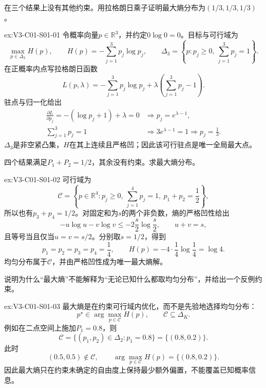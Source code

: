 \begin{SLChapterExercisePairSection}

\begin{exercise}\label{ex:V3-C01-S01-01}
在三个结果上没有其他约束。用拉格朗日乘子证明最大熵分布为$(1/3,1/3,1/3)$。
\end{exercise}
\ifSLFullEdition
{}\label{sol:V3-C01-S01-01}
\begin{chapterexercisesolution}{ex:V3-C01-S01-01}
令概率向量$p\in\mathbb R^3$，并约定$0\log0=0$。目标与可行域为
\[
\max_{p\in\Delta_3}H(p),
\qquad
H(p)=-\sum_{j=1}^{3}p_j\log p_j,
\qquad
\Delta_3=\left\{p:p_j\geq0,\ \sum_{j=1}^{3}p_j=1\right\}.
\]
在正概率内点写拉格朗日函数
\[
L(p,\lambda)=-\sum_{j=1}^{3}p_j\log p_j
+\lambda\left(\sum_{j=1}^{3}p_j-1\right).
\]
驻点与归一化给出
\[
\begin{aligned}
\frac{\partial L}{\partial p_j}=-(\log p_j+1)+\lambda=0
&\Longrightarrow p_j=e^{\lambda-1},\\
\sum_{j=1}^{3}p_j=1
&\Longrightarrow 3e^{\lambda-1}=1
\Longrightarrow p_j=\frac13.
\end{aligned}
\]
$\Delta_3$是非空紧凸集，$H$在其上连续且严格凹；因此该可行驻点是唯一全局最大点。
\end{chapterexercisesolution}
\fi

\begin{exercise}\label{ex:V3-C01-S01-02}
四个结果满足$P_1+P_2=1/2$，其余没有约束。求最大熵分布。
\end{exercise}
\ifSLFullEdition
{}\label{sol:V3-C01-S01-02}
\begin{chapterexercisesolution}{ex:V3-C01-S01-02}
可行域为
\[
\mathcal C=\left\{p\in\mathbb R^4:
p_j\geq0,\ \sum_{j=1}^{4}p_j=1,\ p_1+p_2=\frac12\right\},
\]
所以也有$p_3+p_4=1/2$。对固定和为$s$的两个非负数，熵的严格凹性给出
\[
-u\log u-v\log v
\leq -2\frac{s}{2}\log\frac{s}{2},
\qquad
u+v=s,
\]
且等号当且仅当$u=v=s/2$。分别取$s=1/2$，得到
\[
p_1=p_2=p_3=p_4=\frac14,
\qquad
H(p)=-4\cdot\frac14\log\frac14=\log4.
\]
均匀分布属于$\mathcal C$，并由严格凹性成为唯一最大熵解。
\end{chapterexercisesolution}
\fi

\begin{exercise}\label{ex:V3-C01-S01-03}
说明为什么“最大熵”不能解释为“无论已知什么都取均匀分布”，并给出一个反例约束。
\end{exercise}
\ifSLFullEdition
{}\label{sol:V3-C01-S01-03}
\begin{chapterexercisesolution}{ex:V3-C01-S01-03}
最大熵是在约束可行域内优化，而不是先验地选择均匀分布：
\[
p^\star\in\arg\max_{p\in\mathcal C}H(p),
\qquad
\mathcal C\subseteq\Delta_K.
\]
例如在二点空间上施加$P_1=0.8$，则
\[
\mathcal C
=\{(p_1,p_2)\in\Delta_2:p_1=0.8\}
=\{(0.8,0.2)\}.
\]
此时
\[
(0.5,0.5)\notin\mathcal C,
\qquad
\arg\max_{p\in\mathcal C}H(p)=\{(0.8,0.2)\}.
\]
因此最大熵只在约束未确定的自由度上保持最少额外偏置，不能覆盖已知概率信息。
\end{chapterexercisesolution}
\fi


\end{SLChapterExercisePairSection}
